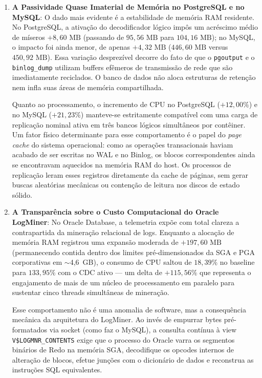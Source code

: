 \documentclass[12pt]{article}
\begin{document}
\begin{enumerate}
  \item \textbf{A Passividade Quase Imaterial de Memória no PostgreSQL e no MySQL}:
  O dado mais evidente é a estabilidade de memória RAM residente. No PostgreSQL, a ativação do decodificador lógico impôs um acréscimo médio de míseros $+8,60\text{ MB}$ (passando de $95,56\text{ MB}$ para $104,16\text{ MB}$); no MySQL, o impacto foi ainda menor, de apenas $+4,32\text{ MB}$ ($446,60\text{ MB}$ versus $450,92\text{ MB}$). Essa variação desprezível decorre do fato de que o \texttt{pgoutput} e o \texttt{binlog\_dump} utilizam buffers efêmeros de transmissão de rede que são imediatamente reciclados. O banco de dados não aloca estruturas de retenção nem infla suas áreas de memória compartilhada.
  
  Quanto ao processamento, o incremento de CPU no PostgreSQL ($+12,00\%$) e no MySQL ($+21,23\%$) manteve-se estritamente compatível com uma carga de replicação nominal ativa em três bancos lógicos simultâneos por contêiner. Um fator físico determinante para esse comportamento é o papel do \textit{page cache} do sistema operacional: como as operações transacionais haviam acabado de ser escritas no WAL e no Binlog, os blocos correspondentes ainda se encontravam aquecidos na memória RAM do host. Os processos de replicação leram esses registros diretamente da cache de páginas, sem gerar buscas aleatórias mecânicas ou contenção de leitura nos discos de estado sólido.

  \item \textbf{A Transparência sobre o Custo Computacional do Oracle LogMiner}:
  No Oracle Database, a telemetria expõe com total clareza a contrapartida da mineração relacional de logs. Enquanto a alocação de memória RAM registrou uma expansão moderada de $+197,60\text{ MB}$ (permanecendo contida dentro dos limites pré-dimensionados da SGA e PGA corporativas em $\sim$4,6~GB), o consumo de CPU saltou de $18,39\%$ no baseline para $133,95\%$ com o CDC ativo — um delta de $+115,56\%$ que representa o engajamento de mais de um núcleo de processamento em paralelo para sustentar cinco threads simultâneas de mineração.
  
  Esse comportamento não é uma anomalia de software, mas a consequência mecânica da arquitetura do LogMiner. Ao invés de empurrar bytes pré-formatados via socket (como faz o MySQL), a consulta contínua à view \texttt{V\$LOGMNR\_CONTENTS} exige que o processo do Oracle varra os segmentos binários de Redo na memória SGA, decodifique os opcodes internos de alteração de blocos, efetue junções com o dicionário de dados e reconstrua as instruções SQL equivalentes.
\end{enumerate}
\end{document}
